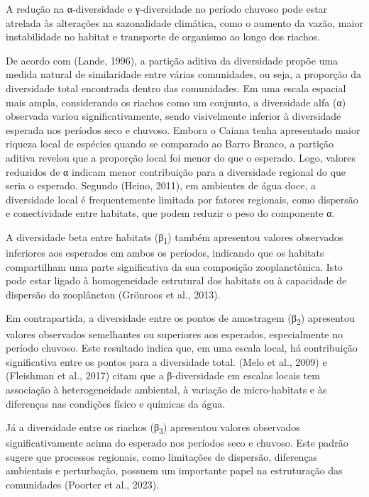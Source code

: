 \documentclass[
  letterpaper,
  DIV=11,
  numbers=noendperiod]{scrartcl}
\begin{document}
A redução na α-diversidade e γ-diversidade no período chuvoso pode estar
atrelada às alterações na sazonalidade climática, como o aumento da
vazão, maior instabilidade no habitat e transporte de organismo ao longo
dos riachos.

De acordo com (Lande, 1996), a partição aditiva da diversidade propõe
uma medida natural de similaridade entre várias comunidades, ou seja, a
proporção da diversidade total encontrada dentro das comunidades. Em uma
escala espacial mais ampla, considerando os riachos como um conjunto, a
diversidade alfa (α) observada variou significativamente, sendo
visivelmente inferior à diversidade esperada nos períodos seco e
chuvoso. Embora o Caiana tenha apresentado maior riqueza local de
espécies quando se comparado ao Barro Branco, a partição aditiva revelou
que a proporção local foi menor do que o esperado. Logo, valores
reduzidos de α indicam menor contribuição para a diversidade regional do
que seria o esperado. Segundo (Heino, 2011), em ambientes de água doce,
a diversidade local é frequentemente limitada por fatores regionais,
como dispersão e conectividade entre habitats, que podem reduzir o peso
do componente α.

A diversidade beta entre habitats (β\textsubscript{1}) também apresentou
valores observados inferiores aos esperados em ambos os períodos,
indicando que os habitats compartilham uma parte significativa da sua
composição zooplanctônica. Isto pode estar ligado à homogeneidade
estrutural dos habitats ou à capacidade de dispersão do zooplâncton
(Grönroos et al., 2013).

Em contrapartida, a diversidade entre os pontos de amostragem
(β\textsubscript{2}) apresentou valores observados semelhantes ou
superiores aos esperados, especialmente no período chuvoso. Este
resultado indica que, em uma escala local, há contribuição significativa
entre os pontos para a diversidade total. (Melo et al., 2009) e
(Fleishman et al., 2017) citam que a β-diversidade em escalas locais tem
associação à heterogeneidade ambiental, à variação de micro-habitats e
às diferenças nas condições físico e químicas da água.

Já a diversidade entre os riachos (β\textsubscript{3}) apresentou
valores observados significativamente acima do esperado nos períodos
seco e chuvoso. Este padrão sugere que processos regionais, como
limitações de dispersão, diferenças ambientais e perturbação, possuem um
importante papel na estruturação das comunidades (Poorter et al., 2023).
\end{document}
